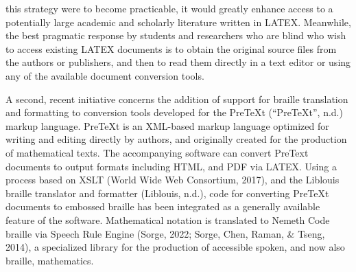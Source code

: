 \documentclass[11pt]{sig-alternate}
\begin{document}
\begin{large}
this strategy were to become practicable, it would greatly enhance access to a potentially large academic and scholarly literature written in LATEX. Meanwhile, the best pragmatic response by students and researchers who are blind who wish to access existing LATEX documents is to obtain the original source files from the authors or publishers, and then to read them directly in a text editor or using any of the available document conversion tools.

A second, recent initiative concerns the addition of support for braille translation and formatting to conversion tools developed for the PreTeXt (“PreTeXt”, n.d.) markup language. PreTeXt is an XML-based markup language optimized for writing and editing directly by authors, and originally created for the production of mathematical texts. The accompanying software can convert PreText documents to output formats including HTML, and PDF via LATEX. Using a process based on XSLT (World Wide Web Consortium, 2017), and the Liblouis braille translator and formatter (Liblouis, n.d.), code for converting PreTeXt documents to embossed braille has been integrated as a generally available feature of the software. Mathematical notation is translated to Nemeth Code braille via Speech Rule Engine (Sorge, 2022; Sorge, Chen, Raman, \& Tseng, 2014), a specialized library for the production of accessible spoken, and now also braille, mathematics.


\end{large}
\end{document}
